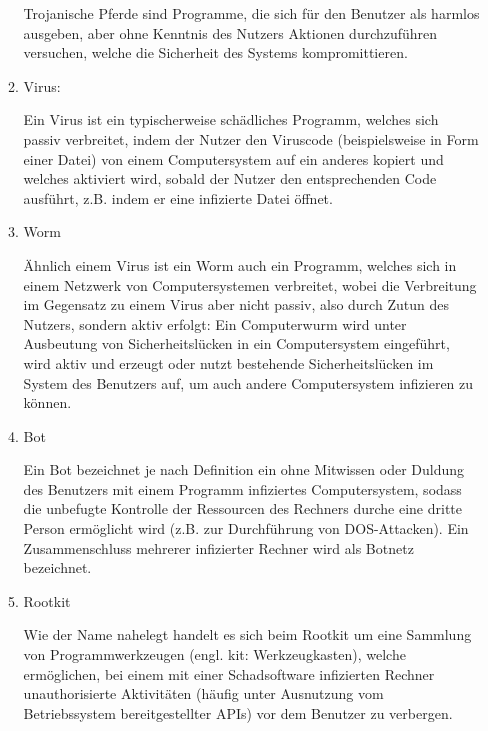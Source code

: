 \documentclass[numbers=noendperiod]{scrartcl}
\begin{document}
\begin{enumerate}[a)]
\begin{enumerate}
		Trojanische Pferde sind Programme, die sich für den Benutzer als harmlos ausgeben, aber ohne Kenntnis des
		Nutzers Aktionen durchzuführen versuchen, welche die Sicherheit des Systems kompromittieren.
		
		\item Virus:
		
		Ein Virus ist ein typischerweise schädliches Programm, welches sich passiv verbreitet, indem der Nutzer den Viruscode (beispielsweise in Form einer Datei) von einem Computersystem auf ein anderes kopiert und welches aktiviert wird, sobald der Nutzer den entsprechenden Code ausführt, z.B. indem er eine infizierte Datei öffnet.
		
		\item Worm
		
		Ähnlich einem Virus ist ein Worm auch ein Programm, welches sich in einem Netzwerk von Computersystemen verbreitet, wobei die Verbreitung im Gegensatz zu einem Virus aber nicht passiv, also durch Zutun des Nutzers, sondern aktiv erfolgt: Ein Computerwurm wird unter Ausbeutung von Sicherheitslücken in ein Computersystem eingeführt, wird aktiv und erzeugt oder nutzt bestehende Sicherheitslücken im System des Benutzers auf, um auch andere Computersystem infizieren zu können.
		
		\item Bot
		
		Ein Bot bezeichnet je nach Definition ein ohne Mitwissen oder Duldung des Benutzers mit einem Programm infiziertes Computersystem, sodass die unbefugte Kontrolle der Ressourcen des Rechners durche eine dritte Person ermöglicht wird (z.B. zur Durchführung von DOS-Attacken). Ein Zusammenschluss mehrerer infizierter Rechner wird als Botnetz bezeichnet.
		
		\item Rootkit
		
		Wie der Name nahelegt handelt es sich beim Rootkit um eine Sammlung von Programmwerkzeugen (engl. kit: Werkzeugkasten), welche ermöglichen, bei einem mit einer Schadsoftware infizierten Rechner unauthorisierte Aktivitäten (häufig unter Ausnutzung vom Betriebssystem bereitgestellter APIs) vor dem Benutzer zu verbergen.
		
		
	\end{enumerate}


\end{enumerate}
\end{document}

